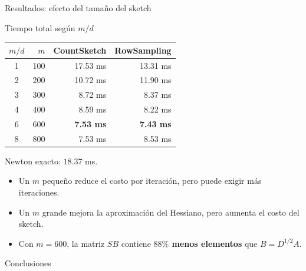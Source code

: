 \documentclass[aspectratio=169,11pt]{beamer}
\begin{document}
\begin{frame}{Resultados: efecto del tamaño del sketch}
\small

\begin{block}{Tiempo total según $m/d$}
\centering
\scriptsize
\renewcommand{\arraystretch}{1.2}
\begin{tabular}{crrr}
\hline
$m/d$ & $m$ & CountSketch & RowSampling\\
\hline
1 & 100 & 17.53 ms & 13.31 ms\\
2 & 200 & 10.72 ms & 11.90 ms\\
3 & 300 & 8.72 ms  & 8.37 ms\\
4 & 400 & 8.59 ms  & 8.22 ms\\
6 & 600 & \textbf{7.53 ms} & \textbf{7.43 ms}\\
8 & 800 & 7.53 ms  & 8.53 ms\\
\hline
\end{tabular}

\vspace{0.1cm}
\footnotesize
Newton exacto: $18.37$ ms.
\end{block}

\vspace{0.1cm}

\begin{itemize}
    \item Un $m$ pequeño reduce el costo por iteración,
    pero puede exigir más iteraciones.
    \item Un $m$ grande mejora la aproximación del
    Hessiano, pero aumenta el costo del sketch.
    \item Con $m=600$, la matriz $SB$ contiene
    \textbf{$88\%$ menos elementos} que
    $B=D^{1/2}A$.
\end{itemize}



\end{frame}


\begin{frame}{Conclusiones}
\end{frame}
\end{document}
